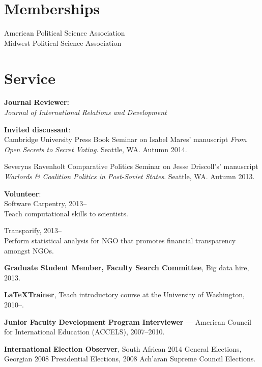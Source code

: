 \documentclass[margin,line]{res}
\begin{document}
{\begin{resume}
\section{\sc Memberships}
American Political Science Association \\
Midwest Political Science Association

\section{\sc Service}
\textbf{Journal Reviewer: }\\
\emph{Journal of International Relations and
  Development} \par\smallskip
\textbf{Invited discussant}: \\
  Cambridge University Press Book Seminar on
Isabel Mares' manuscript \emph{From Open Secrets to Secret
  Voting}. Seattle, WA. Autumn 2014. \par\smallskip
 Severyns Ravenholt Comparative Politics Seminar on
Jesse Driscoll's' manuscript \emph{Warlords \& Coalition Politics in
  Post-Soviet States}. Seattle, WA. Autumn 2013. \par\smallskip
\textbf{Volunteer}: \\
Software Carpentry, 2013--  \\
Teach computational skills to
scientists.\par\smallskip
Transparify, 2013--\\
 Perform statistical analysis for NGO that promotes
financial transparency amongst NGOs.  \par\smallskip
\textbf{Graduate Student Member, Faculty Search Committee}, Big data
hire, 2013. \par\smallskip
\textbf{\LaTeX Trainer}, Teach introductory \latex course at the University of
Washington, 2010--. \par\smallskip
\textbf{Junior Faculty Development Program Interviewer} --- American Council for
International Education (ACCELS), 2007--2010. \par\smallskip
\textbf{International Election Observer}, South African 2014 General Elections, Georgian 2008 Presidential Elections, 2008 Ach'aran Supreme Council Elections. 


\end{resume}}
\end{document}
